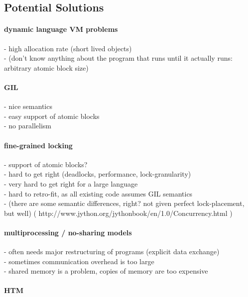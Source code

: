 \documentclass{sigplanconf}
\begin{document}
\subsection{Potential Solutions}

\paragraph{dynamic language VM problems}

- high allocation rate (short lived objects)\\
- (don't know anything about the program that runs until it actually runs: arbitrary atomic block size)

\paragraph{GIL}

- nice semantics\\
- easy support of atomic blocks\\
- no parallelism

\paragraph{fine-grained locking}

- support of atomic blocks?\\
- hard to get right (deadlocks, performance, lock-granularity)\\
- very hard to get right for a large language\\
- hard to retro-fit, as all existing code assumes GIL semantics\\
- (there are some semantic differences, right? not given perfect lock-placement, but well)
( http://www.jython.org/jythonbook/en/1.0/Concurrency.html )

\paragraph{multiprocessing / no-sharing models}

- often needs major restructuring of programs (explicit data exchange)\\
- sometimes communication overhead is too large\\
- shared memory is a problem, copies of memory are too expensive

\paragraph{HTM}
\end{document}
